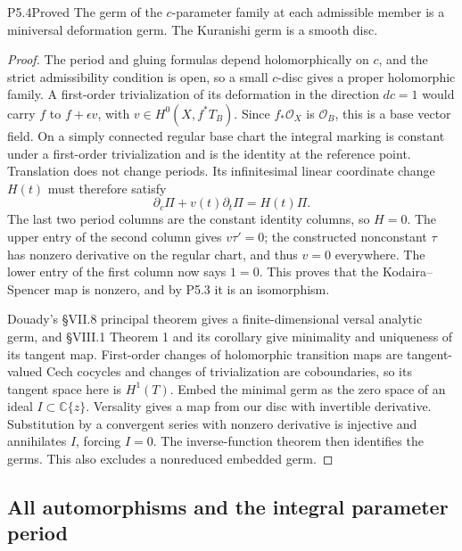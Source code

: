 \begin{statement}{P5.4}{Proved}
The germ of the $c$-parameter family at each admissible member is a
miniversal deformation germ.  The Kuranishi germ is a smooth disc.
\end{statement}
\begin{proof}
The period and gluing formulas depend holomorphically on $c$, and the
strict admissibility condition is open, so a small $c$-disc gives a
proper holomorphic family.  A first-order trivialization of its
deformation in the direction $dc=1$ would carry $f$ to
$f+\epsilon v$, with $v\in H^0(X,f^*T_B)$.  Since $f_*\mathcal O_X$
is $\mathcal O_B$, this is a base vector field.  On a simply connected
regular base chart the integral marking is constant under a first-order
trivialization and is the identity at the reference point.  Translation
does not change periods.  Its infinitesimal linear coordinate change
$H(t)$ must therefore satisfy
\[
 \partial_c\Pi+v(t)\partial_t\Pi=H(t)\Pi.
\]
The last two period columns are the constant identity columns, so
$H=0$.  The upper entry of the second column gives $v\tau'=0$; the
constructed nonconstant $\tau$ has nonzero derivative on the regular
chart, and thus $v=0$ everywhere.  The lower entry of the first column
now says $1=0$.  This proves that the Kodaira--Spencer map is nonzero,
and by P5.3 it is an isomorphism.

Douady's \S VII.8 principal theorem gives a finite-dimensional versal
analytic germ, and \S VIII.1 Theorem 1 and its corollary give minimality
and uniqueness of its tangent map.  First-order changes of holomorphic
transition maps are tangent-valued Cech cocycles and changes of
trivialization are coboundaries, so its tangent space here is $H^1(T)$.
Embed the minimal germ as the zero space of an ideal
$I\subset\mathbb C\{z\}$.  Versality gives a map from our disc with
invertible derivative.  Substitution by a convergent series with
nonzero derivative is injective and annihilates $I$, forcing $I=0$.
The inverse-function theorem then identifies the germs.  This also
excludes a nonreduced embedded germ.
\end{proof}

\subsection{All automorphisms and the integral parameter period}

